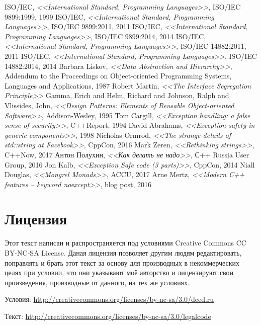\documentclass[a4paper,12pt,oneside]{article}
\begin{document}
\begin{thebibliography}{99}
 ISO/IEC, \textit{<<International Standard, Programming Languages>>}, ISO/IEC 9899:1999, 1999
 ISO/IEC, \textit{<<International Standard, Programming Languages>>}, ISO/IEC 9899:2011, 2011
 ISO/IEC, \textit{<<International Standard, Programming Languages>>}, ISO/IEC 9899:2014, 2014
 ISO/IEC, \textit{<<International Standard, Programming Languages>>}, ISO/IEC 14882:2011, 2011
 ISO/IEC, \textit{<<International Standard, Programming Languages>>}, ISO/IEC 14882:2014, 2014
 Barbara Liskov, \textit{<<Data Abstraction and Hierarchy>>}, Addendum to the Proceedings on Object-oriented Programming Systems, Languages and Applications, 1987
 Robert Martin, \textit{<<The Interface Segregation Principle>>}
 Gamma, Erich and Helm, Richard and Johnson, Ralph and Vlissides, John, \textit{<<Design Patterns: Elements of Reusable Object-oriented Software>>}, Addison-Wesley, 1995
 Tom Cargill, \textit{<<Exception handling: a false sense of security>>}, C++Report, 1994
 David Abrahams, \textit{<<Exception-safety in generic components>>}, 1998
 Nicholas Ormrod, \textit{<<The strange details of std::string at Facebook>>}, CppCon, 2016
 Mark Zeren, \textit{<<Rethinking strings>>}, C++Now, 2017
 Антон Полухин, \textit{<<Как делать не надо>>}, С++ Russia User Group, 2016
 Jon Kalb, \textit{<<Exception Safe code (3 parts)>>}, CppCon, 2014
 Niall Douglas, \textit{<<Mongrel Monads>>}, ACCU, 2017
 Arne Mertz, \textit{<<Modern C++ features – keyword noexcept>>}, blog post, 2016
\end{thebibliography}

\pagebreak
\section*{Лицензия}

Этот текст написан и распространяется под условиями Creative Commons CC BY-NC-SA License. Даная лицензия позволяет другим людям редактировать, поправлять и брать этот текст за основу для производных в некоммерческих целях при условии, что они указывают моё авторство и лицензируют свои произведения, производные от данного, на тех же условиях.

Условия: \url{http://creativecommons.org/licenses/by-nc-sa/3.0/deed.ru}

Текст: \url{http://creativecommons.org/licenses/by-nc-sa/3.0/legalcode}

\pagebreak
\printindex
\end{document}
